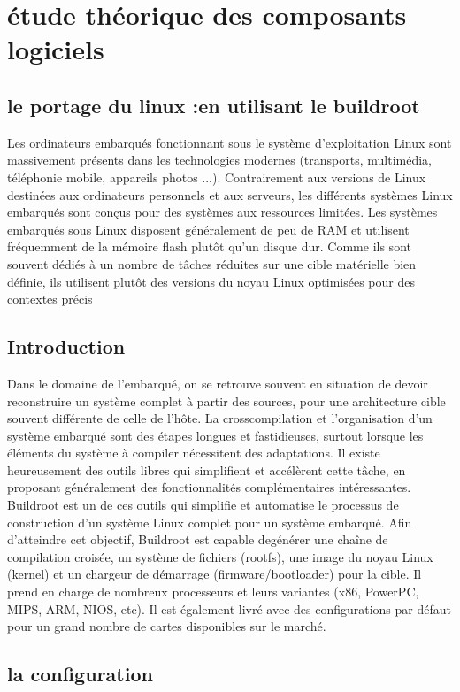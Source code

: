\documentclass[11pt]{report}
\begin{document}
\section{étude théorique des composants logiciels}
\subsection*{le portage du linux :en utilisant le buildroot}

Les ordinateurs embarqués fonctionnant sous le système d’exploitation Linux sont
massivement présents dans les technologies modernes (transports, multimédia, téléphonie
mobile, appareils photos ...). Contrairement aux versions de Linux destinées aux ordinateurs
personnels et aux serveurs, les différents systèmes Linux embarqués sont conçus pour des
systèmes aux ressources limitées. Les systèmes embarqués sous Linux disposent
généralement de peu de RAM et utilisent fréquemment de la mémoire flash plutôt qu'un
disque dur. Comme ils sont souvent dédiés à un nombre de tâches réduites sur une cible
matérielle bien définie, ils utilisent plutôt des versions du noyau Linux optimisées pour des
contextes précis
\subsection{Introduction}
Dans le domaine de l'embarqué, on se retrouve souvent en situation de devoir reconstruire un
système complet à partir des sources, pour une architecture cible souvent différente de celle
de l’hôte. La crosscompilation et l'organisation d'un système embarqué sont des étapes
longues et fastidieuses, surtout lorsque les éléments du système à compiler nécessitent des
adaptations. Il existe heureusement des outils libres qui simplifient et accélèrent cette tâche,
en proposant généralement des fonctionnalités complémentaires intéressantes. Buildroot est
un de ces outils qui simplifie et automatise le processus de construction d'un système Linux
complet pour un système embarqué. Afin d'atteindre cet objectif, Buildroot est capable degénérer une chaîne de compilation croisée, un système de fichiers (rootfs), une image du
noyau Linux (kernel) et un chargeur de démarrage (firmware/bootloader) pour la cible. Il
prend en charge de nombreux processeurs et leurs variantes (x86, PowerPC, MIPS, ARM,
NIOS, etc). Il est également livré avec des configurations par défaut pour un grand nombre de
cartes disponibles sur le marché.
\subsection{la configuration}
\end{document}
